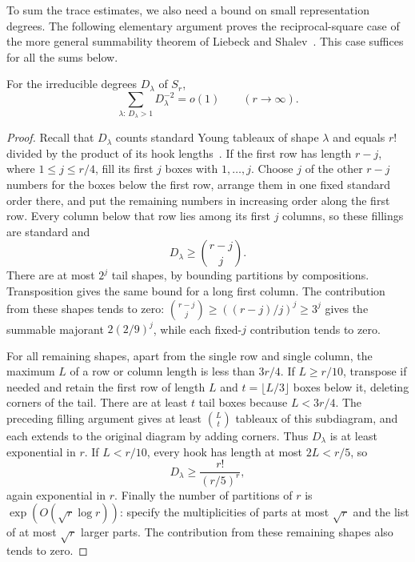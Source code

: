 To sum the trace estimates, we also need a bound on small representation degrees. The following elementary argument proves the reciprocal-square case of the more general summability theorem of Liebeck and Shalev~\cite[Theorem~2.6]{liebeck-shalev2004}. This case suffices for all the sums below.

\begin{lemma}\label{lem:degree-sum}
For the irreducible degrees $D_\lambda$ of $S_r$,
\begin{equation}
 \sum_{\lambda:\,D_\lambda>1}D_\lambda^{-2}=o(1)
       \qquad(r\longrightarrow\infty).\label{eq:degree-square-sum}
\end{equation}
\end{lemma}
\begin{proof}
Recall that $D_\lambda$ counts standard Young tableaux of shape $\lambda$ and equals $r!$ divided by the product of its hook lengths~\cite{sagan,etingof}. If the first row has length $r-j$, where $1\le j\le r/4$, fill its first $j$ boxes with $1,\ldots,j$. Choose $j$ of the other $r-j$ numbers for the boxes below the first row, arrange them in one fixed standard order there, and put the remaining numbers in increasing order along the first row. Every column below that row lies among its first $j$ columns, so these fillings are standard and
\[
 D_\lambda\ge\binom{r-j}{j}.
\]
There are at most $2^j$ tail shapes, by bounding partitions by compositions. Transposition gives the same bound for a long first column. The contribution from these shapes tends to zero: $\binom{r-j}{j}\ge((r-j)/j)^j\ge3^j$ gives the summable majorant $2(2/9)^j$, while each fixed-$j$ contribution tends to zero.

For all remaining shapes, apart from the single row and single column, the maximum $L$ of a row or column length is less than $3r/4$. If $L\ge r/10$, transpose if needed and retain the first row of length $L$ and $t=\lfloor L/3\rfloor$ boxes below it, deleting corners of the tail. There are at least $t$ tail boxes because $L<3r/4$. The preceding filling argument gives at least $\binom{L}{t}$ tableaux of this subdiagram, and each extends to the original diagram by adding corners. Thus $D_\lambda$ is at least exponential in $r$. If $L<r/10$, every hook has length at most $2L<r/5$, so
\[
 D_\lambda\ge\frac{r!}{(r/5)^r},
\]
again exponential in $r$. Finally the number of partitions of $r$ is $\exp(O(\sqrt r\log r))$: specify the multiplicities of parts at most $\sqrt r$ and the list of at most $\sqrt r$ larger parts. The contribution from these remaining shapes also tends to zero.
\end{proof}

